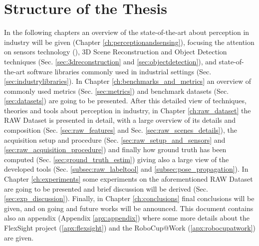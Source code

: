 \section{Structure of the Thesis}\label{sec:thesisstructure}
In the following chapters an overview of the state-of-the-art about perception in industry will be given (Chapter \ref{ch:perceptionandsensing}), focusing the attention on sensors technology (), 3D Scene Reconstruction and Object Detection techniques (Sec. \ref{sec:3dreconstruction} and \ref{sec:objectdetection}), and state-of-the-art software libraries commonly used in industrial settings (Sec. \ref{sec:industrylibraries}). In Chapter \ref{ch:benchmarks_and_metrics} an overview of commonly used metrics (Sec. \ref{sec:metrics}) and benchmark datasets (Sec. \ref{sec:datasets}) are going to be presented. After this detailed view of techniques, theories and tools about perception in industry, in Chapter \ref{ch:raw_dataset} the RAW Dataset is presented in detail, with a large overview of its details and composition (Sec. \ref{sec:raw_features} and Sec. \ref{sec:raw_scenes_details}), the acquisition setup and procedure (Sec. \ref{sec:raw_setup_and_sensors} and \ref{sec:raw_acquisition_procedure}) and finally how ground truth has been computed (Sec. \ref{sec:ground_truth_estim}) giving also a large view of the developed tools (Sec. \ref{subsec:raw_labeltool} and \ref{subsec:pose_propagation}). In Chapter \ref{ch:experiments} some experiments on the aforementioned RAW Dataset are going to be presented and brief discussion will be derived (Sec. \ref{sec:exp_discussion}). Finally, in Chapter \ref{ch:conclusions} final conclusions will be given, and on going and future works will be announced. This document contains also an appendix (Appendix \ref{apx:appendix}) where some more details about the FlexSight project (\ref{apx:flexsight}) and the RoboCup@Work (\ref{apx:robocupatwork}) are given.